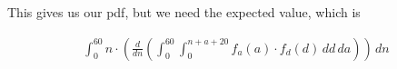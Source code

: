 \documentclass[11pt]{article}\usepackage[]{graphicx}\usepackage[]{xcolor}
\begin{document}
\begin{easylist}[enumerate]
    This gives us our pdf, but we need the expected value, which is

    \begin{equation}
        \begin{aligned}
            \int_0^{60} n \cdot \left(
                 \frac{d}{dn} \left(
                     \int_0^{60} \int_0^{n + a + 20} f_a(a) \cdot f_d(d) \, dd\,da
                 \right)
             \right) \, dn
        \end{aligned}
    \end{equation}

\end{easylist}
\end{document}
